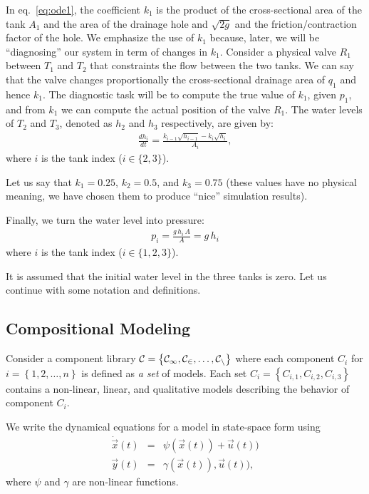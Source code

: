 %
In eq.~\ref{eq:ode1}, the coefficient $k_1$ is the product of the
cross-sectional area of the tank $A_1$ and the area of the drainage
hole and $\sqrt{2g}$ and the friction/contraction factor of the
hole. We emphasize the use of $k_1$ because, later, we will be
``diagnosing'' our system in term of changes in $k_1$. Consider a
physical valve $R_1$ between $T_1$ and $T_2$ that constraints the flow
between the two tanks. We can say that the valve changes
proportionally the cross-sectional drainage area of $q_1$ and hence
$k_1$. The diagnostic task will be to compute the true value of $k_1$,
given $p_1$, and from $k_1$ we can compute the actual position of the
valve $R_1$.
%
The water levels of $T_2$ and $T_3$, denoted as $h_2$ and $h_3$
respectively, are given by:
%
\begin{eqnarray}\label{eq:tank1}
%
\frac{d h_i}{dt} = \frac{k_{i - 1} \sqrt{h_{i - 1}} - k_i \sqrt{h_i}}{A_i},
%
\end{eqnarray}
%
where $i$ is the tank index ($i \in \{2, 3\}$).
\par
Let us say that $k_1 = 0.25$, $k_2 = 0.5$, and $k_3 = 0.75$ (these
values have no physical meaning, we have chosen them to produce
``nice'' simulation results).
\par
Finally, we turn the water level into pressure:
\begin{eqnarray}
p_i = \frac{g\,h_i\,A}{A} = g\,h_i
\end{eqnarray}
where $i$ is the tank index ($i \in \{1, 2, 3\}$).
\par
It is assumed that the initial water level in the three tanks is zero.
%
Let us continue with some notation and definitions.
%
\subsection{Compositional Modeling}
%
Consider a component library $\cal{C} = \left\{C_1, C_2, \ldots,
C_n\right\}$ where each component $C_i$ for $i = \left\{1, 2, \ldots,
n\right\}$ is defined as \textit{a set} of models. Each set $C_i =
\left\{C_{i, 1}, C_{i, 2}, C_{i, 3}\right\}$ contains a non-linear,
linear, and qualitative models describing the behavior of component
$C_i$.

\begin{definition}
We write the dynamical equations for a model in state-space form using
\begin{eqnarray}\label{dyn-model}
\dot{\vec{x}}(t) & = & \psi (\vec{x}(t)) + \vec{u}(t))\\
\vec{y}(t) & = & \gamma (\vec{x}(t)), \vec{u}(t)),
\end{eqnarray}
where $\psi$ and $\gamma$ are non-linear functions.
\end{definition}

